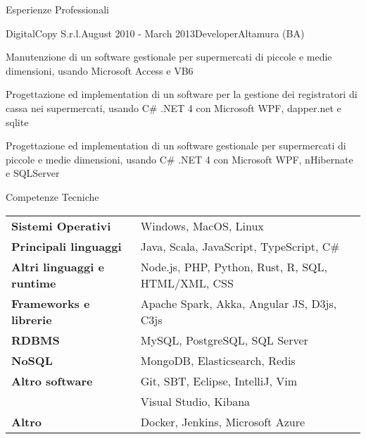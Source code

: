 \documentclass{resume} %
\begin{document}
\begin{rSection}{Esperienze Professionali}

\begin{rSubsection}{DigitalCopy S.r.l.}{August 2010 - March 2013}{Developer}{Altamura (BA)}
\item Manutenzione di un software gestionale per supermercati di piccole e medie dimensioni, usando Microsoft Access e VB6
\item Progettazione ed implementation di un software per la gestione dei registratori di cassa nei supermercati, usando C\# .NET 4 con Microsoft WPF, dapper.net e sqlite
\item Progettazione ed implementation di un software gestionale per supermercati di piccole e medie dimensioni, usando C\# .NET 4 con Microsoft WPF, nHibernate e SQLServer
\end{rSubsection}

\end{rSection}


\begin{rSection}{Competenze Tecniche}

\begin{tabular}{ @{} >{\bfseries}l @{\hspace{6ex}} l }
Sistemi Operativi & Windows, MacOS, Linux \\
Principali linguaggi & Java, Scala, JavaScript, TypeScript, C\# \\
Altri linguaggi e runtime & Node.js, PHP, Python, Rust, R, SQL, HTML/XML, CSS \\
Frameworks e librerie & Apache Spark, Akka, Angular JS, D3js, C3js \\
RDBMS & MySQL, PostgreSQL, SQL Server \\
NoSQL & MongoDB, Elasticsearch, Redis \\
Altro software & Git, SBT, Eclipse, IntelliJ, Vim \\
& Visual Studio, Kibana \\
Altro & Docker, Jenkins, Microsoft Azure \\
\end{tabular}

\end{rSection}

\end{document}
